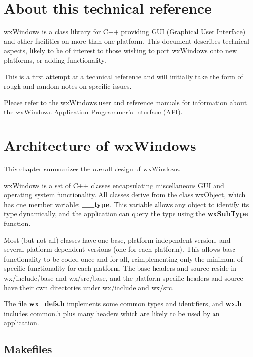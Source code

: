 \chapter{About this technical reference}
%
%
\setfooter{\thepage}{}{}{}{}{\thepage}

wxWindows is a class library for C++ providing GUI (Graphical User
Interface) and other facilities on more than one platform. This document
describes technical aspects, likely to be of interest to those wishing
to port wxWindows onto new platforms, or adding functionality.

This is a first attempt at a technical reference and will initially
take the form of rough and random notes on specific issues.

Please refer to the wxWindows user and reference manuals for information
about the wxWindows Application Programmer's Interface (API).

\chapter{Architecture of wxWindows}

This chapter summarizes the overall design of wxWindows.

wxWindows is a set of C++ classes encapsulating miscellaneous GUI and operating
system functionality. All classes derive from the class wxObject, which
has one member variable: {\bf \_\_type}. This variable allows any object to identify
its type dynamically, and the application can query the type using the {\bf wxSubType} function.

Most (but not all) classes have one base, platform-independent version,
and several platform-dependent versions (one for each platform). This allows base functionality
to be coded once and for all, reimplementing only the minimum of specific functionality
for each platform. The base headers and source reside in wx/include/base and wx/src/base,
and the platform-specific headers and source have their own directories under wx/include
and wx/src.

The file {\bf wx\_defs.h} implements some common types and identifiers, and {\bf wx.h}\rtfsp
includes common.h plus many headers which are likely to be used by an application.

\section{Makefiles}

